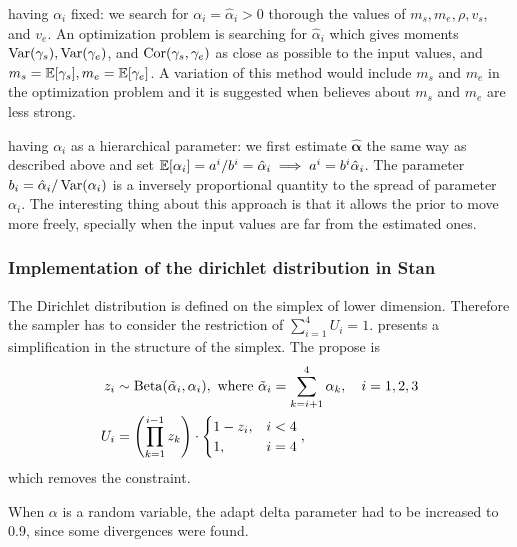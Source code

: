 \begin{alineas}
  \item having $\alpha_i$ fixed: we search for $\alpha_i = \hat{\alpha}_i >
  0$ thorough the values of $m_s, m_e, \rho, v_s$, and $v_e$. An optimization
  problem is searching for $\hat{\alpha}_i$ which gives moments
  $\operatorname{Var}(\gamma_s), \operatorname{Var}(\gamma_e)$, and $\operatorname{Cor}(\gamma_s, \gamma_e)$ as close as
  possible to the input values, and $m_s = \mathbb{E}[\gamma_s], m_e =
  \mathbb{E}[\gamma_e]$. A variation of this method would include $m_s$ and $m_e$ in
  the optimization problem and it is suggested when believes about $m_s$ and
  $m_e$ are less strong. 
  \item having $\alpha_i$ as a hierarchical parameter: we first estimate
  $\hat{\boldsymbol{\alpha}}$ the same way as described above and set
  $\mathbb{E}[\alpha_i] = a^i/b^i = \hat{\alpha}_i \implies a^i = b^i\hat{\alpha}_i$.
  The parameter $b_i = \hat{\alpha}_i/\operatorname{Var}(\alpha_i)$ is a inversely
  proportional quantity to the spread of parameter $\alpha_i$. The interesting
  thing about this approach is that it allows the prior to move more freely,
  specially when the input values are far from the estimated ones. 
\end{alineas}

\subsubsection*{Implementation of the dirichlet distribution in Stan}

The Dirichlet distribution is defined on the simplex of lower dimension.
Therefore the sampler has to consider the restriction of $\sum_{i=1}^4 U_i =
1$. \textcite{betancourt2012cruising} presents a simplification in the
structure of the simplex. The propose is \cite[p. 2]{betancourt2012cruising}
\begin{equation*}
  \begin{aligned}
    z_i &\sim \operatorname{Beta}(\tilde{\alpha}_i, \alpha_i), \text{ where } \tilde{\alpha}_i = \sum_{k=i+1}^4 \alpha_k, \quad i = 1,2,3 \\
    U_i &= \left(\prod_{k=1}^{i-1} z_k\right)\cdot \begin{cases}
      1 - z_i, &i < 4 \\
      1, &i = 4
    \end{cases},
  \end{aligned}
\end{equation*}
which removes the constraint. 

\begin{remark}
  When $\alpha$ is a random variable, the adapt delta parameter had to be
  increased to 0.9, since some divergences were found. 
\end{remark}

